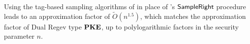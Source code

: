 Using the tag-based sampling algorithms of \cite{EC:MicPei12} in place of \cite{EC:AgrBonBoy10}'s $\mathsf{SampleRight}$ procedure leads to an approximation factor of $\widetilde{O}(n^{1.5})$, which matches the approximation factor of Dual Regev type $\mathbf{PKE}$, up to polylogarithmic factors in the security parameter $n$.
